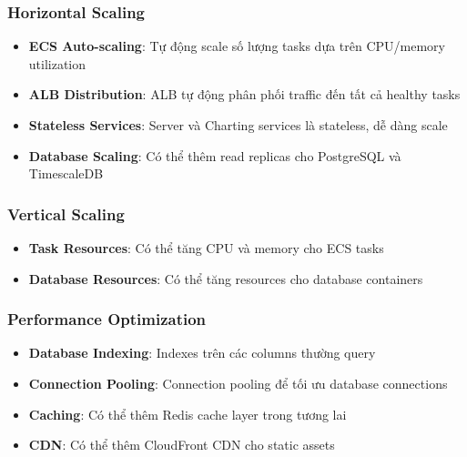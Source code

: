 \subsubsection{Horizontal Scaling}

\begin{itemize}
    \item \textbf{ECS Auto-scaling}: Tự động scale số lượng tasks dựa trên CPU/memory utilization
    \item \textbf{ALB Distribution}: ALB tự động phân phối traffic đến tất cả healthy tasks
    \item \textbf{Stateless Services}: Server và Charting services là stateless, dễ dàng scale
    \item \textbf{Database Scaling}: Có thể thêm read replicas cho PostgreSQL và TimescaleDB
\end{itemize}

\subsubsection{Vertical Scaling}

\begin{itemize}
    \item \textbf{Task Resources}: Có thể tăng CPU và memory cho ECS tasks
    \item \textbf{Database Resources}: Có thể tăng resources cho database containers
\end{itemize}

\subsubsection{Performance Optimization}

\begin{itemize}
    \item \textbf{Database Indexing}: Indexes trên các columns thường query
    \item \textbf{Connection Pooling}: Connection pooling để tối ưu database connections
    \item \textbf{Caching}: Có thể thêm Redis cache layer trong tương lai
    \item \textbf{CDN}: Có thể thêm CloudFront CDN cho static assets
\end{itemize}


